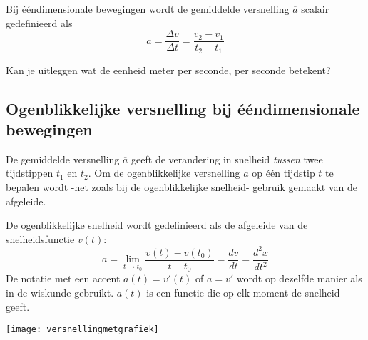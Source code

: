 \documentclass{ximera}
\begin{document}
\begin{definition}

Bij ééndimensionale bewegingen wordt de gemiddelde versnelling \(\overline{a}\) scalair gedefinieerd als
\[
\overline{a}=\frac{\Delta v}{\Delta t}=\frac{v_2-v_1}{t_2-t_1}
\]
\end{definition}

\begin{denkvraag*}{}
Kan je uitleggen wat de eenheid meter per seconde, per seconde betekent? 
\end{denkvraag*}

\subsection*{Ogenblikkelijke versnelling bij ééndimensionale bewegingen}

De gemiddelde versnelling \(\overline{a}\) geeft de verandering in snelheid \textit{tussen} twee tijdstippen \(t_1\) en \(t_2\).  Om de ogenblikkelijke versnelling \(a\) op één tijdstip \(t\) te bepalen wordt -net zoals bij de ogenblikkelijke snelheid- gebruik gemaakt van de afgeleide. 

\begin{definition}
De ogenblikkelijke snelheid wordt gedefinieerd als de afgeleide van de snelheidsfunctie \(v(t)\):
\[
a=\lim_{t\to t_0}\frac{v(t)-v(t_0)}{t-t_0} = \frac{dv}{dt}=\frac{d^2x}{dt^2}
\]
De notatie met een accent $a(t)=v'(t)$ of $a=v'$ wordt op dezelfde manier als in de wiskunde gebruikt. $a(t)$ is een functie die op elk moment de snelheid geeft. 
\end{definition}

\begin{image}
\texttt{[image: versnellingmetgrafiek]}
\end{image}
\end{document}
